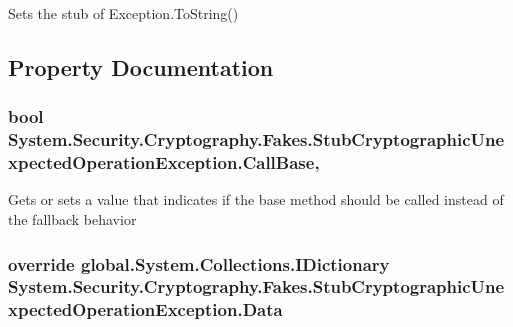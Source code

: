 Sets the stub of Exception.\-To\-String()



\subsection{Property Documentation}
\hypertarget{class_system_1_1_security_1_1_cryptography_1_1_fakes_1_1_stub_cryptographic_unexpected_operation_exception_adaf46be22e60f62dcc4ce5aed8a038a2}{
\subsubsection[{Call\-Base}]{\setlength{\rightskip}{0pt plus 5cm}bool System.\-Security.\-Cryptography.\-Fakes.\-Stub\-Cryptographic\-Unexpected\-Operation\-Exception.\-Call\-Base\hspace{0.3cm}{\ttfamily [get]}, {\ttfamily [set]}}}\label{class_system_1_1_security_1_1_cryptography_1_1_fakes_1_1_stub_cryptographic_unexpected_operation_exception_adaf46be22e60f62dcc4ce5aed8a038a2}


Gets or sets a value that indicates if the base method should be called instead of the fallback behavior

\hypertarget{class_system_1_1_security_1_1_cryptography_1_1_fakes_1_1_stub_cryptographic_unexpected_operation_exception_ac9a7709be6a9f3dcd46be1fa4b4b334b}{
\subsubsection[{Data}]{\setlength{\rightskip}{0pt plus 5cm}override global.\-System.\-Collections.\-I\-Dictionary System.\-Security.\-Cryptography.\-Fakes.\-Stub\-Cryptographic\-Unexpected\-Operation\-Exception.\-Data\hspace{0.3cm}{\ttfamily [get]}}}\label{class_system_1_1_security_1_1_cryptography_1_1_fakes_1_1_stub_cryptographic_unexpected_operation_exception_ac9a7709be6a9f3dcd46be1fa4b4b334b}


